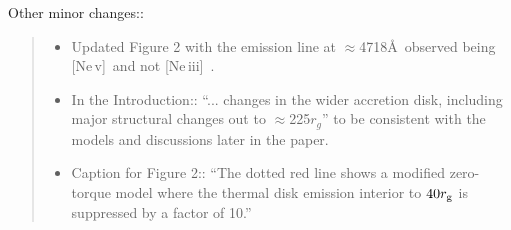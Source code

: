 \documentclass[11pt, a4paper]{article}
\begin{document}
\noindent
Other minor changes::

\begin{quote}
  \begin{itemize}
  \item Updated Figure 2 with the emission line at $\approx$4718\AA\ observed being [Ne\,{\sc v}]\ and not [Ne\,{\sc iii}]\ .
  \item In the Introduction:: ``... changes in the wider accretion disk, including major structural changes out to $\approx$225$r_{g}$'' to be consistent with the models and discussions later in the paper. 
  \item Caption for Figure 2:: ``The dotted red line shows a modified zero-torque model where the thermal disk emission interior to $40 r_{\rm g}$ is suppressed by a factor of 10.''
  \end{itemize}
\end{quote}
\end{document}
